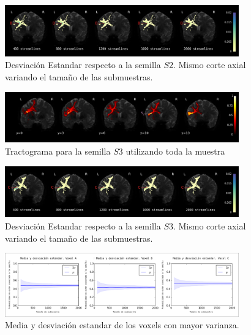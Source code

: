 \begin{figure}[h!]
   \centering
    \includegraphics[width=0.9\textwidth]{img/s2.png}
    \caption{Desviaci\'on Estandar respecto a la semilla $S2$. Mismo corte axial
             variando el tama\~no de las submuestras.}
    \label{fig:s2}
\end{figure}

\begin{figure}[h!]
   \centering
    \includegraphics[width=0.9\textwidth]{img/m3.png}
    \caption{Tractograma para la semilla $S3$ utilizando toda la muestra}
    \label{fig:m3}
\end{figure}

\begin{figure}[h!]
   \centering
    \includegraphics[width=0.9\textwidth]{img/s3.png}
    \caption{Desviaci\'on Estandar respecto a la semilla $S3$. Mismo corte axial
             variando el tama\~no de las submuestras.}
    \label{fig:s3}
\end{figure}

\begin{figure}[h!]
   \centering
    \includegraphics[width=0.9\textwidth]{img/med_var_all.png}
    \caption{Media y desviaci\'on estandar de los voxels con mayor varianza.}
    \label{fig:mv}
\end{figure}

\vspace{10cm}
